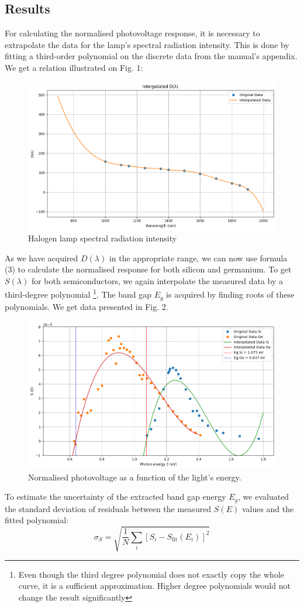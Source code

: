 \documentclass[english,11pt,a4paper]{article}
\begin{document}
\begin{multicols}{2}
		\section{Results}
		For calculating the normalised photovoltage response, it is necessary to extrapolate the data for the lamp's spectral radiation intensity. This is done by fitting a third-order polynomial on the discrete data from the manual's appendix. We get a relation illustrated on Fig. 1:
		
		\begin{figure}[H]
			\centering
			\includegraphics[width=0.9\linewidth]{D}
			\caption{Halogen lamp spectral radiation intensity}
			\label{fig:mereni}
		\end{figure}
		As we have acquired $D(\lambda)$ in the appropriate range, we can now use formula (3) to calculate the normalised response for both silicon and germanium. To get $S(\lambda)$ for both semiconductors, we again interpolate the measured data by a third-degree polynomial \footnote{Even though the third degree polynomial does not exactly copy the whole curve, it is a sufficient approximation. Higher degree polynomials would not change the result significantly}. The band gap $E_g$ is acquired by finding roots of these polynomials. We get data presented in Fig. 2.
		\begin{figure}[H]
			\centering
			\includegraphics[width=0.9\linewidth]{results}
			\caption{Normalised photovoltage as a function of the light's energy.}
			\label{fig:mereni}
		\end{figure}
		To estimate the uncertainty of the extracted band gap energy $E_g$, we evaluated the standard deviation of residuals between the measured $S(E)$ values and the fitted polynomial:
		\[
		\sigma_S = \sqrt{\frac{1}{N} \sum_i \left[S_i - S_\text{fit}(E_i)\right]^2}
		\]
		

\end{multicols}
\end{document}
